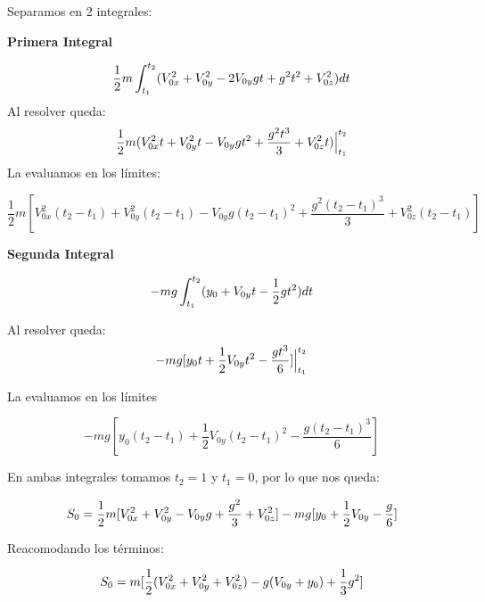 \documentclass{article}
\begin{document}
Separamos en 2 integrales:

\textbf{Primera Integral}

\[
\centering
    \frac{1}{2}m\int_{t_1}^{t_2} (V_{0x}^2 + V_{0y}^2 - 2V_{0y}gt+ g^2t^2+ V_{0z}^2)dt
\]
Al resolver queda:
\[
\centering
    \frac{1}{2}m(V_{0x}^2t + V_{0y}^2t - V_{0y}gt^2+ \frac{g^2t^3}{3} + V_{0z}^2t)\Big|_{t_1}^{t_2}
\]
La evaluamos en los límites:

\[
    \frac{1}{2}m[V_{0x}^2(t_2-t_1) + V_{0y}^2(t_2-t_1) - V_{0y}g(t_2-t_1)^2+ \frac{g^2(t_2-t_1)^3}{3} + V_{0z}^2(t_2-t_1)]
\]


\textbf{Segunda Integral}

\[
\centering
    -mg\int_{t_1}^{t_2} (y_{0} + V_{0y}t - \frac{1}{2}gt^2)dt
\]

Al resolver queda:
\[
\centering
    -mg[y_0t+ \frac{1}{2}V_{0y}t^2 - \frac{gt^3}{6}]\Big|_{t_1}^{t_2}
\]

La evaluamos en los límites

\[
   -mg[y_0(t_2-t_1)+ \frac{1}{2}V_{0y}(t_2-t_1)^2 - \frac{g(t_2-t_1)^3}{6}]
\]

En ambas integrales tomamos $t_2=1$ y $t_1=0$, por lo que nos queda:

\begin{equation}
\centering
   S_0= \frac{1}{2}m[V_{0x}^2 + V_{0y}^2 - V_{0y}g+ \frac{g^2}{3} + V_{0z}^2]-mg[y_0+ \frac{1}{2}V_{0y} - \frac{g}{6}]
\end{equation}

Reacomodando los términos:

\begin{equation}
\centering
   S_0= m[ \frac{1}{2}(V_{0x}^2 + V_{0y}^2 + V_{0z}^2) - g(V_{0y} + y_0) + \frac{1}{3} g^2]
\end{equation}

\vspace{0.5cm}
\begin{center}
\end{center}  \vspace{0.5cm}
\end{document}
